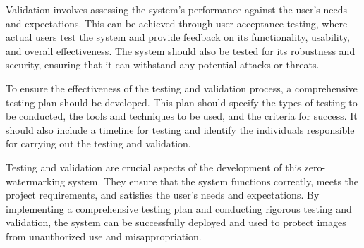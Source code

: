 \documentclass[12pt]{report}
\begin{document}
Validation involves assessing the system's performance against the user's needs and expectations. This can be achieved through user acceptance testing, where actual users test the system and provide feedback on its functionality, usability, and overall effectiveness. The system should also be tested for its robustness and security, ensuring that it can withstand any potential attacks or threats.
\newline

To ensure the effectiveness of the testing and validation process, a comprehensive testing plan should be developed. This plan should specify the types of testing to be conducted, the tools and techniques to be used, and the criteria for success. It should also include a timeline for testing and identify the individuals responsible for carrying out the testing and validation.
\newline

Testing and validation are crucial aspects of the development of this zero-watermarking system. They ensure that the system functions correctly, meets the project requirements, and satisfies the user's needs and expectations. By implementing a comprehensive testing plan and conducting rigorous testing and validation, the system can be successfully deployed and used to protect images from unauthorized use and misappropriation.
\newline
\end{document}
